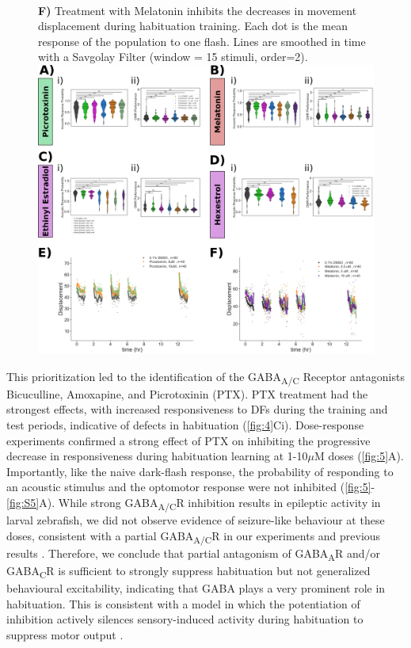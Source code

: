 \documentclass[9pt,lineno]{RandlettLab_elife}
\begin{document}
\begin{figure}
{\\ \textbf{F)} Treatment with Melatonin inhibits the decreases in movement displacement during habituation training. Each dot is the mean response of the population to one flash. Lines are smoothed in time with a Savgolay Filter (window = 15 stimuli, order=2).}{\includegraphics[width=14cm]{FigureS2_DrugBehavData_wDisp.png}}
\label{fig:S5}
\end{figure}


This prioritization led to the identification of the GABA\textsubscript{A/C} Receptor antagonists Bicuculline, Amoxapine, and Picrotoxinin (PTX). PTX treatment had the strongest effects, with increased responsiveness to DFs during the training and test periods, indicative of defects in habituation (\autoref{fig:4}Ci). Dose-response experiments confirmed a strong effect of PTX on inhibiting the progressive decrease in responsiveness during habituation learning at 1-10$\mu$M doses (\autoref{fig:5}A). Importantly, like the naive dark-flash response, the probability of responding to an acoustic stimulus and the optomotor response were not inhibited (\autoref{fig:5}-\autoref{fig:S5}A). While strong GABA\textsubscript{A/C}R inhibition results in epileptic activity in larval zebrafish, we did not observe evidence of seizure-like behaviour at these doses, consistent with a partial GABA\textsubscript{A/C}R in our experiments and previous results \citep{Bandara2020-nm}. Therefore, we conclude that partial antagonism of GABA\textsubscript{A}R and/or GABA\textsubscript{C}R is sufficient to strongly suppress habituation but not generalized behavioural excitability, indicating that GABA plays a very prominent role in habituation. This is consistent with a model in which the potentiation of inhibition actively silences sensory-induced activity during habituation to suppress motor output \citep{Cooke2020-mz, Ramaswami2014-du}. 
\end{document}
